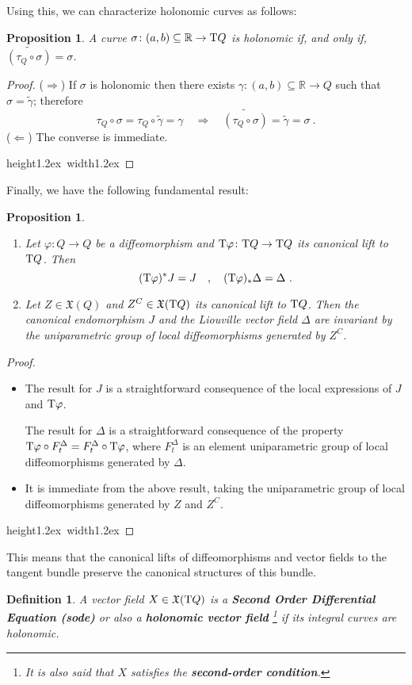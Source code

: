 \documentclass[12pt]{report}
\newtheorem{prop}[teor]{Proposition}
\newtheorem{definition}[teor]{Definition}
\def\ben{\begin{enumerate}}
\def\een{\end{enumerate}}
\def\bit{\begin{itemize}}
\def\eit{\end{itemize}}
\def\qed{\ifvmode\removelastskip\fi
{\unskip\nobreak\hfil\penalty50\hbox{}\nobreak\hfil
\hbox{\vrule height1.2ex width1.2ex}\parfillskip=0pt
\finalhyphendemerits=0 \par\smallskip}}
\def\vf{\mathfrak X}
\def\Real{\mathbb{R}}
\def\Tan{{\rm T}}
\begin{document}
Using this, we can characterize holonomic curves as follows: 

\begin{prop}
A curve $\sigma\colon (a,b)\subseteq\Real\to\Tan Q$ is 
holonomic if, and only if,
$\widetilde{(\tau_Q\circ\sigma)}=\sigma$.
\end{prop}
\begin{proof}
($\Longrightarrow$) \quad
If $\sigma$ is holonomic then there exists $\gamma\colon (a,b)\subseteq\Real\to Q$
such that $\sigma=\widetilde  \gamma$; therefore
$$
\tau_Q\circ\sigma=\tau_Q\circ\widetilde  \gamma=\gamma
\quad \Longrightarrow \quad
\widetilde{(\tau_Q\circ\sigma)}=\widetilde  \gamma=\sigma \ .
$$
($\Longleftarrow$) \quad
The converse is immediate.
\\ \qed  \end{proof}

Finally, we have the following fundamental result:

\begin{prop}
\label{lema2}
\ben
\item
Let $\varphi\colon Q\to Q$ be a diffeomorphism and
$\Tan\varphi\colon \Tan Q \to \Tan Q$ its canonical lift to $\Tan Q$. Then
$$
(\Tan\varphi)^*J = J\quad , \quad
(\Tan\varphi)_*\Delta=\Delta \ .
$$
\item
Let $Z\in\vf (Q)$ and $Z^C\in\vf(\Tan Q)$  its canonical lift to $\Tan Q$.
Then the canonical endomorphism $J$ and the Liouville vector field $\Delta$
are invariant by the uniparametric group of local diffeomorphisms generated by $Z^C$.
\label{constq}
\een
\end{prop}
\begin{proof}
\bit
\item
The result for $J$ is  a straightforward consequence of the local expressions
of $J$ and $\Tan\varphi$.

The result for $\Delta$ is  a straightforward consequence of the property
$\Tan\varphi\circ F_t^\Delta=F_t^\Delta\circ\Tan\varphi$,
where $F_t^\Delta$ is an element uniparametric group of local diffeomorphisms generated by $\Delta$.
\item
It is immediate from the above result, taking the
uniparametric group of local diffeomorphisms generated by $Z$ and $Z^C$.
\eit
\qed  \end{proof}

This means that the canonical lifts of diffeomorphisms and vector fields
to the tangent bundle preserve the canonical structures of this bundle.

\begin{definition}
A vector field $X\in\vf(\Tan Q)$ is a
\textbf{Second Order Differential Equation ({\sc sode})}
or also a \textbf{holonomic vector field}
\footnote{It is also said that $X$ satisfies the 
\textbf{second-order condition}.}
if its integral curves are holonomic.
\end{definition}
\end{document}
